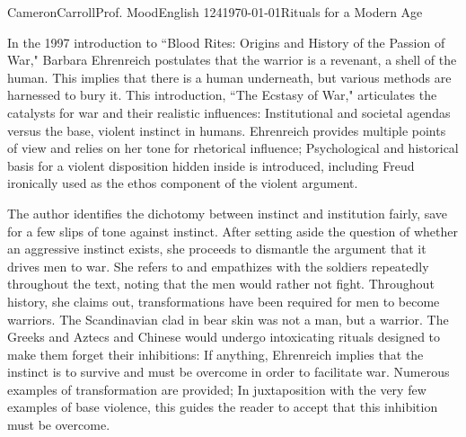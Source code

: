 \documentclass[12pt,letterpaper]{article}
\begin{document}
\begin{mla}{Cameron}{Carroll}{Prof. Mood}{English 124}{\today}{Rituals for a Modern Age}


In the 1997 introduction to ``Blood Rites: Origins and History of the Passion of War," Barbara Ehrenreich postulates that the warrior is a revenant, a shell of the human. This implies that there is a human underneath, but various methods are harnessed to bury it. This introduction, ``The Ecstasy of War," articulates the catalysts for war and their realistic influences: Institutional and societal agendas versus the base, violent instinct in humans. Ehrenreich provides multiple points of view and relies on her tone for rhetorical influence; Psychological and historical basis for a violent disposition hidden inside is introduced, including Freud ironically used as the ethos component of the violent argument. 

The author identifies the dichotomy between instinct and institution fairly, save for a few slips of tone against instinct. After setting aside the question of whether an aggressive instinct exists, she proceeds to dismantle the argument that it drives men to war. She refers to and empathizes with the soldiers repeatedly throughout the text, noting that the men would rather not fight. Throughout history, she claims out, transformations have been required for men to become warriors. The Scandinavian clad in bear skin was not a man, but a warrior. The Greeks and Aztecs and Chinese would undergo intoxicating rituals designed to make them forget their inhibitions: If anything, Ehrenreich implies that the instinct is to survive and must be overcome in order to facilitate war. Numerous examples of transformation are provided; In juxtaposition with the very few examples of base violence, this guides the reader to accept that this inhibition must be overcome.


\end{mla}
\end{document}
